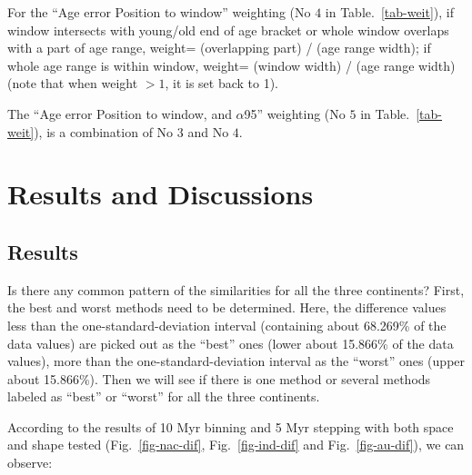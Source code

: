For the ``Age error Position to window'' weighting (No $4$ in
Table.~\ref{tab-weit}), if window intersects with young/old end of age bracket
or whole window overlaps with a part of age range, weight= (overlapping part)
/ (age range width); if whole age range is within window, weight= (window width)
/ (age range width) (note that when weight $>1$, it is set back to 1).

The ``Age error Position to window, and $\alpha$95'' weighting (No $5$ in
Table.~\ref{tab-weit}), is a combination of No $3$ and No $4$.

\section{Results and Discussions}

\subsection{Results}

Is there any common pattern of the similarities for all the three continents?
First, the best and worst methods need to be determined. Here, the difference
values less than the one-standard-deviation interval (containing about 68.269\%
of the data values) are picked out as the ``best'' ones (lower about 15.866\% of
the data values), more than the one-standard-deviation interval as the ``worst''
ones (upper about 15.866\%). Then we will see if there is one method or several
methods labeled as ``best'' or ``worst'' for all the three continents.

According to the results of 10 Myr binning and 5 Myr stepping with both space
and shape tested (Fig.~\ref{fig-nac-dif}, Fig.~\ref{fig-ind-dif} and
Fig.~\ref{fig-au-dif}), we can observe:

